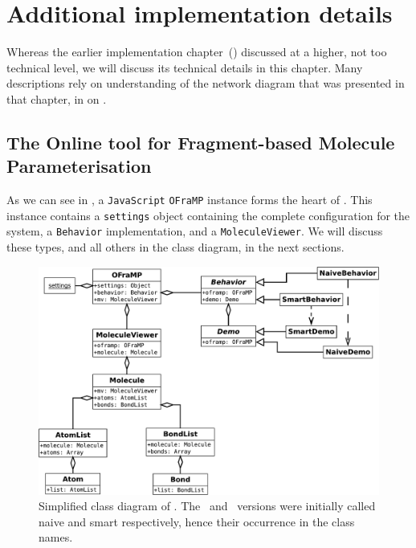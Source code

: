 \chapter[Additional implementation]{Additional implementation details}

Whereas the earlier implementation chapter~() discussed \oframp{} at a higher, not too technical level, we will discuss its technical details in this chapter. Many descriptions rely on understanding of the network diagram that was presented in that chapter, in  on .



\section[\oframp]{The Online tool for Fragment-based Molecule Parameterisation}
As we can see in , a \verb|JavaScript| \verb|OFraMP| instance forms the heart of \oframp. This instance contains a \verb|settings| object containing the complete configuration for the system, a \verb|Behavior| implementation, and a \verb|MoleculeViewer|. We will discuss these types, and all others in the class diagram, in the next sections.

\begin{figure}
\center
\includegraphics[width=\textwidth]{img/oframp_class.pdf}
\caption{Simplified class diagram of \oframp. The \IDa\ and \IDb\ versions were initially called naive and smart respectively, hence their occurrence in the class names.}
\end{figure}


